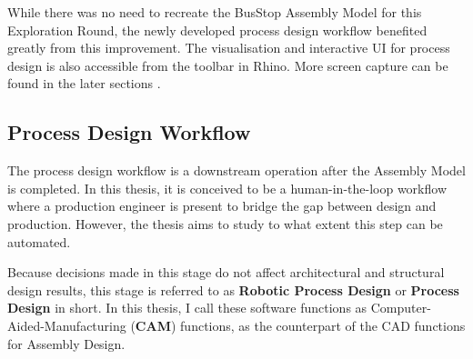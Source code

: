 While there was no need to recreate the BusStop Assembly Model for this Exploration Round, the newly developed process design workflow  benefited greatly from this improvement. The visualisation and interactive UI for process design is also accessible from the toolbar in Rhino. More screen capture can be found in the later sections .

\subsection{Process Design Workflow}
\label{subsection:exploration-3-process-design-workflow}

The process design workflow is a downstream operation after the Assembly Model is completed. In this thesis, it is conceived to be a human-in-the-loop workflow where a production engineer is present to bridge the gap between design and production. However, the thesis aims to study to what extent this step can be automated.

Because decisions made in this stage do not affect architectural and structural design results, this stage is referred to as\textbf{ Robotic Process Design} or \textbf{Process Design }in short. In this thesis, I call these software functions as Computer-Aided-Manufacturing (\textbf{CAM}) functions, as the counterpart of the CAD functions for Assembly Design.

